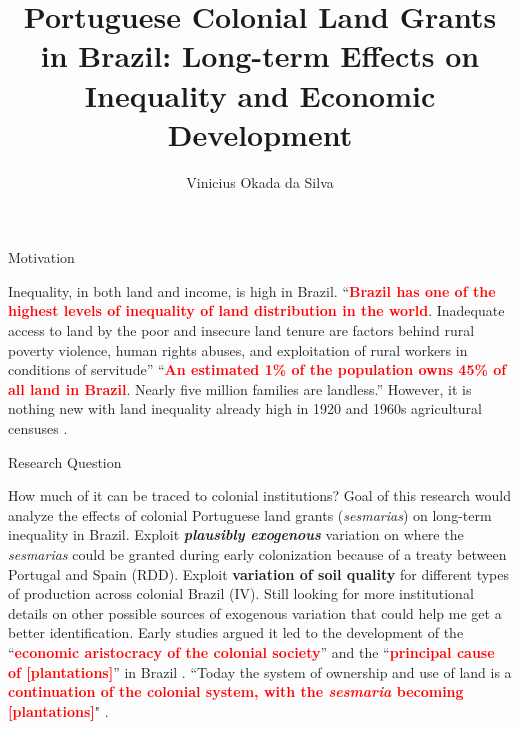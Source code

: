 \documentclass[aspectratio=1610]{beamer}
\title{Portuguese Colonial Land Grants in Brazil: Long-term Effects on Inequality and Economic Development}
\author{Vinicius Okada da Silva}
\institute{AMRL}
\date{}
\begin{document}
\begin{frame}
	\titlepage
\end{frame}

\begin{frame}{Motivation}
    \begin{outline}
        \1 Inequality, in both land and income, is high in Brazil.
            \vspace{1mm}
            \2 ``\textcolor{red}{\textbf{Brazil has one of the highest levels of inequality of land distribution in the world}}. Inadequate access to land by the poor and insecure land tenure are factors behind rural poverty violence, human rights abuses, and exploitation of rural workers in conditions of servitude'' \parencite{Usaid2016-xs}
            \vspace{1mm}
            \pause 
            \2 ``\textcolor{red}{\textbf{An estimated 1\% of the population owns 45\% of all land in Brazil}}. Nearly five million families are landless.'' \parencite{Usaid2016-xs}
        \pause 
        \1 However, it is nothing new with land inequality already high in 1920 and 1960s agricultural censuses \parencites{Alston2010-cn}{Wigton-Jones2020-ex}.
    \end{outline}
\end{frame}

\begin{frame}{Research Question}
    \begin{outline}
        \1 How much of it can be traced to colonial institutions?
            \vspace{1mm}
            \2 Goal of this research would analyze the effects of colonial Portuguese land grants (\textit{sesmarias}) on long-term inequality in Brazil.
            \vspace{1mm}
            \2 Exploit \textbf{\textit{plausibly exogenous}} variation on where the \textit{sesmarias} could be granted during early colonization because of a treaty between Portugal and Spain (RDD). 
            \2 Exploit \textbf{variation of soil quality} for different types of production across colonial Brazil (IV).
            \vspace{1mm}
            \2 Still looking for more institutional details on other possible sources of exogenous variation that could help me get a better identification.
        \pause 
        \1 Early studies argued it led to the development of the ``\textcolor{red}{\textbf{economic aristocracy of the colonial society}}'' and the ``\textcolor{red}{\textbf{principal cause of [plantations]}}'' in Brazil \parencites[p.~36]{Lima2002-kd}[p.~48]{Da_Costa_Porto1979-dz}.
        \vspace{1mm}
        \1 ``Today the system of ownership and use of land is a \textcolor{red}{\textbf{continuation of the colonial system, with the \textit{sesmaria} becoming [plantations]}}" \parencite[p.~18]{Andrade1980-md}.
    \end{outline}
\end{frame}
\end{document}
